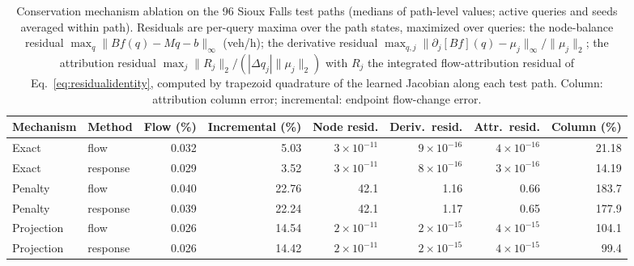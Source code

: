 \begin{table}[pos=htbp]\centering\footnotesize
\caption{Conservation mechanism ablation on the 96 Sioux Falls test
paths (medians of path-level values; active queries and seeds averaged
within path). Residuals are per-query maxima over the path states,
maximized over queries: the node-balance residual
$\max_q\|Bf(q)-Mq-b\|_\infty$ (veh/h); the derivative residual
$\max_{q,j}\|\partial_j[Bf](q)-\mu_j\|_\infty/\|\mu_j\|_2$; the
attribution residual $\max_j\|R_j\|_2/(|\Delta q_j|\|\mu_j\|_2)$
with $R_j$ the integrated flow-attribution residual of
Eq.~\eqref{eq:residualidentity}, computed by trapezoid quadrature of
the learned Jacobian along each test path. Column: attribution column
error; incremental: endpoint flow-change error.}\label{tab:conservation}
\setlength{\tabcolsep}{4pt}
\begin{tabular*}{\tblwidth}{@{\extracolsep{\fill}}llrrrrrr}
\toprule
Mechanism & Method & Flow (\%) & Incremental (\%) & Node resid. & Deriv.\ resid. & Attr.\ resid. & Column (\%)\\
\midrule
Exact & flow & 0.032 & 5.03 & $3\times10^{-11}$ & $9\times10^{-16}$ & $4\times10^{-16}$ & 21.18\\
Exact & response & 0.029 & 3.52 & $3\times10^{-11}$ & $8\times10^{-16}$ & $3\times10^{-16}$ & 14.19\\
\addlinespace
Penalty & flow & 0.040 & 22.76 & 42.1 & 1.16 & 0.66 & 183.7\\
Penalty & response & 0.039 & 22.24 & 42.1 & 1.17 & 0.65 & 177.9\\
\addlinespace
Projection & flow & 0.026 & 14.54 & $2\times10^{-11}$ & $2\times10^{-15}$ & $4\times10^{-15}$ & 104.1\\
Projection & response & 0.026 & 14.42 & $2\times10^{-11}$ & $2\times10^{-15}$ & $4\times10^{-15}$ & 99.4\\
\bottomrule\end{tabular*}\end{table}

